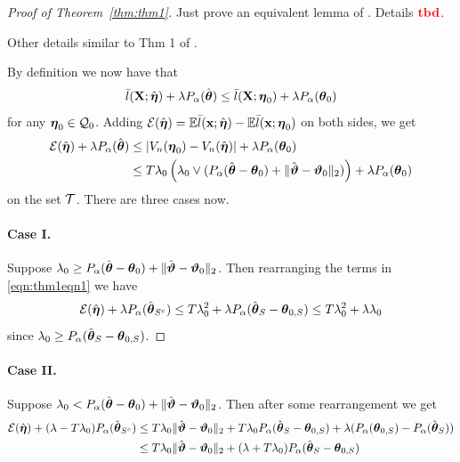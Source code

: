 \documentclass[11pt,letterpaper]{article}
\DeclareMathOperator*{\rtbd}{{\colrbf tbd}}
\numberwithin{equation}{section}
\begin{document}
\begin{proof}[Proof of Theorem~\ref{thm:thm1}]
Just prove an equivalent lemma of \cite{StadlerEtal10}. Details $\rtbd$.

Other details similar to Thm 1 of \cite{StadlerEtal10}.

By definition we now have that
$$
\bar l({\mathbf{X}}; \hat {{\boldsymbol{\eta}}}) + \lambda P_\alpha (\hat {{\boldsymbol{\theta}}}) \leq
\bar l({\mathbf{X}}; {\boldsymbol{\eta}}_0) + \lambda P_\alpha ({\boldsymbol{\theta}}_0)
$$
%
for any ${\boldsymbol{\eta}}_0 \in {\cal{Q}}_0$. Adding ${\cal{E}}(\hat {{\boldsymbol{\eta}}}) = {\mathbb{E}} \bar l({\bf{x}}; \hat {{\boldsymbol{\eta}}}) - {\mathbb{E}} \bar l({\bf{x}}; {\boldsymbol{\eta}}_0)$ on both sides, we get
%
\begin{align}
{\cal{E}}(\hat {{\boldsymbol{\eta}}}) + \lambda P_\alpha (\hat {{\boldsymbol{\theta}}}) & \leq
|V_n({\boldsymbol{\eta}}_0) - V_n(\hat {{\boldsymbol{\eta}}})| + \lambda P_\alpha ({\boldsymbol{\theta}}_0) \notag \\
& \leq T \lambda_0 \left( \lambda_0 \vee (P_\alpha (\hat {{\boldsymbol{\theta}}} - {\boldsymbol{\theta}}_0 ) +
\| \hat {{\boldsymbol{\vartheta}}} - {\boldsymbol{\vartheta}}_0 \|_2) \right) + \lambda P_\alpha ({\boldsymbol{\theta}}_0) \label{eqn:thm1eqn1}
\end{align}
%
on the set ${\cal{T}}$. There are three cases now.

\paragraph{Case I.} Suppose $\lambda_0 \geq P_\alpha (\hat {{\boldsymbol{\theta}}} - {\boldsymbol{\theta}}_0) + \| \hat {{\boldsymbol{\vartheta}}} - {\boldsymbol{\vartheta}}_0 \|_2$. Then rearranging the terms in \eqref{eqn:thm1eqn1} we have
%
$$
{\cal{E}}(\hat {{\boldsymbol{\eta}}}) + \lambda P_\alpha (\hat {{\boldsymbol{\theta}}}_{S^c}) \leq
T \lambda_0^2 + \lambda P_\alpha (\hat {{\boldsymbol{\theta}}}_S - {\boldsymbol{\theta}}_{0,S} )
\leq T \lambda_0^2 + \lambda \lambda_0
$$
%
since $\lambda_0 \geq P_\alpha (\hat {{\boldsymbol{\theta}}}_S - {\boldsymbol{\theta}}_{0,S} )$.
\end{proof}

\paragraph{Case II.} Suppose $\lambda_0 < P_\alpha (\hat {{\boldsymbol{\theta}}} - {\boldsymbol{\theta}}_0) + \| \hat {{\boldsymbol{\vartheta}}} - {\boldsymbol{\vartheta}}_0 \|_2$. Then after some rearrangement we get
%
\begin{align*}
{\cal{E}}(\hat {{\boldsymbol{\eta}}}) + (\lambda - T\lambda_0) P_\alpha (\hat {{\boldsymbol{\theta}}}_{S^c}) & \leq
T\lambda_0 \| \hat {{\boldsymbol{\vartheta}}} - {\boldsymbol{\vartheta}}_0 \|_2 + T\lambda_0 P_\alpha (\hat {{\boldsymbol{\theta}}}_S - {\boldsymbol{\theta}}_{0,S} ) +
\lambda (P_\alpha ({\boldsymbol{\theta}}_{0,S}) - P_\alpha (\hat {{\boldsymbol{\theta}}}_S))\\
& \leq T\lambda_0 \| \hat {{\boldsymbol{\vartheta}}} - {\boldsymbol{\vartheta}}_0 \|_2 + (\lambda + T \lambda_0) P_\alpha (\hat {{\boldsymbol{\theta}}}_S - {\boldsymbol{\theta}}_{0,S} )
\end{align*}
\end{document}
